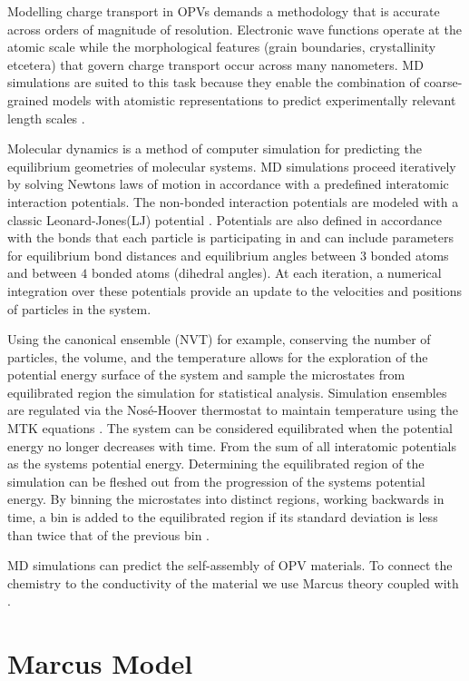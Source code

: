 Modelling charge transport in OPVs demands a methodology that is accurate across orders of magnitude of
resolution. Electronic wave functions operate at the atomic scale while the morphological features (grain
boundaries, crystallinity etcetera) that govern charge transport occur across many nanometers. MD simulations
are suited to this task because they enable the combination of coarse-grained models with atomistic
representations to predict experimentally relevant length scales \cite{Miller2018}.

Molecular dynamics is a method of computer simulation for predicting the equilibrium geometries of molecular
systems. MD simulations proceed iteratively by solving Newtons laws of motion
in accordance with a predefined interatomic interaction potentials.  
The non-bonded interaction potentials are modeled with a classic Leonard-Jones(LJ)
potential \cite{Jones1924a}. Potentials are also defined in accordance with the bonds that each particle is
participating in and can include parameters for equilibrium bond distances and equilibrium angles between
$3$ bonded atoms and between $4$ bonded atoms (dihedral angles).
At each iteration, a numerical integration over these potentials provide an update to the velocities and positions
of particles in the system. 

Using the canonical ensemble (NVT) for example, conserving the number of
particles, the volume, and the temperature allows for the exploration of the potential energy surface
of the system and sample the microstates from equilibrated region the simulation for statistical analysis.  
Simulation ensembles are regulated via the Nos\'{e}-Hoover thermostat \cite{Hoover1985} to maintain 
temperature using the MTK equations \cite{Martyna1994d}\cite{Cao1996}.
The system can be considered equilibrated when the potential energy no longer decreases with time. 
From the sum of all interatomic potentials as the systems potential energy. Determining the equilibrated region of the
simulation can be fleshed out from the progression of the systems potential energy. By binning the microstates
into distinct regions, working backwards in time, a bin is added to the equilibrated region if its standard
deviation is less than twice that of the previous bin \cite{Henry2017a}.

MD simulations can predict the self-assembly of OPV materials. To connect the chemistry to the
conductivity of the material we use Marcus theory coupled with .

\section{Marcus Model}
\label{marcusmodel}

